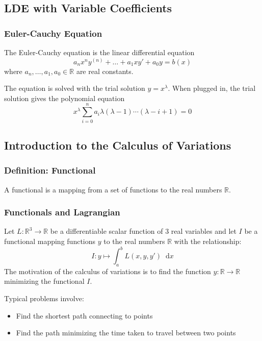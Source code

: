 \documentclass[11pt, a4paper]{article}
\newcommand{\diff}{\mathop{}\!\mathrm{d}} %
\newcommand{\R}{\mathbb{R}} %
\begin{document}
\subsection{LDE with Variable Coefficients}

\subsubsection{Euler-Cauchy Equation}
The Euler-Cauchy equation is the linear differential equation
\begin{equation*}
	a_n x^n y^{(n)} + \dots + a_1 x y' + a_0 y = b(x)
\end{equation*}
where $ a_n, \dots, a_1, a_0 \in \R $ are real constants.

The equation is solved with the trial solution $ y = x^{\lambda} $. When plugged in, the trial solution gives the polynomial equation
\begin{equation*}
	x^{\lambda} \sum_{i = 0}^{n} a_i \lambda (\lambda - 1) \cdots (\lambda - i + 1) = 0
\end{equation*}

\subsection{Introduction to the Calculus of Variations}

\subsubsection{Definition: Functional}
A functional is a mapping from a set of functions to the real numbers $ \R $.

\subsubsection{Functionals and Lagrangian}
Let $ L: \R^3 \to \R $ be a differentiable scalar function of 3 real variables and let $ I $ be a functional mapping functions $ y $ to the real numbers $ \R $ with the relationship:
\begin{equation*}
	I : y \mapsto \int_{a}^{b} L(x, y, y') \diff x
\end{equation*}
The motivation of the calculus of variations is to find the function $ y : \R \to \R  $ minimizing the functional $ I $.

Typical problems involve:
\begin{itemize}
	\item Find the shortest path connecting to points
	\item Find the path minimizing the time taken to travel between two points
\end{itemize}
\end{document}
